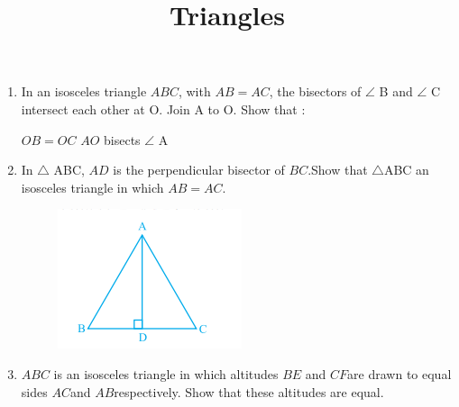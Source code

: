 \documentclass[12pt]{article}
\begin{document}
\title{\textbf{Triangles}}
\maketitle
\begin{center}
\end{center}

\begin{enumerate}
\section*{9$^{th}$ Maths - Chapter 7}

\item In an isosceles triangle $ABC$, with $AB = AC$, the bisectors of $\angle$ B and $\angle$ C intersect each other at O. Join A to O. Show that :
\begin{enumerate}
$OB = OC$  $AO$ bisects $\angle$ A
\end{enumerate}
\item In $\triangle$ ABC, $AD$ is the perpendicular bisector of $BC$.Show that $\triangle$ABC an isosceles triangle in which $AB = AC$.
\begin{figure}[!h]
\begin{center}
\includegraphics[width=\columnwidth]{./figs/triangle2.png}
\end{center}                                      \caption{}                                        \label{fig:Fig1}                                  \end{figure}
\item $ABC$ is an isosceles triangle in which altitudes $BE$ and $CF $are drawn to equal sides $AC $and $AB$respectively. Show that these altitudes are equal.

\end{enumerate}
\end{document}
